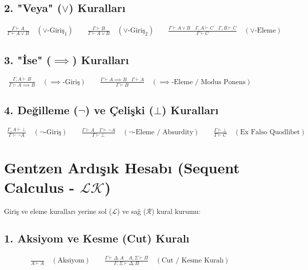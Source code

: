 \documentclass[11pt, a4paper]{article}
\begin{document}
\subsection{2. "Veya" ($\lor$) Kuralları}
\begin{align}
\frac{\Gamma \vdash A}{\Gamma \vdash A \lor B} \quad (\lor\text{-Giriş}_1) \qquad
\frac{\Gamma \vdash B}{\Gamma \vdash A \lor B} \quad (\lor\text{-Giriş}_2) \qquad
\frac{\Gamma \vdash A \lor B \quad \Gamma, A \vdash C \quad \Gamma, B \vdash C}{\Gamma \vdash C} \quad (\lor\text{-Eleme})
\end{align}

\subsection{3. "İse" ($\implies$) Kuralları}
\begin{align}
\frac{\Gamma, A \vdash B}{\Gamma \vdash A \implies B} \quad (\implies\text{-Giriş}) \qquad
\frac{\Gamma \vdash A \implies B \quad \Gamma \vdash A}{\Gamma \vdash B} \quad (\implies\text{-Eleme / Modus Ponens})
\end{align}

\subsection{4. Değilleme ($\neg$) ve Çelişki ($\bot$) Kuralları}
\begin{align}
\frac{\Gamma, A \vdash \bot}{\Gamma \vdash \neg A} \quad (\neg\text{-Giriş}) \qquad
\frac{\Gamma \vdash A \quad \Gamma \vdash \neg A}{\Gamma \vdash \bot} \quad (\neg\text{-Eleme / Absurdity}) \qquad
\frac{\Gamma \vdash \bot}{\Gamma \vdash C} \quad (\text{Ex Falso Quodlibet})
\end{align}

\section{Gentzen Ardışık Hesabı (Sequent Calculus - $\mathcal{L}\mathcal{K}$)}

Giriş ve eleme kuralları yerine sol ($\mathcal{L}$) ve sağ ($\mathcal{R}$) kural kurumu:

\subsection{1. Aksiyom ve Kesme (Cut) Kuralı}
\begin{align}
\frac{}{A \vdash A} \quad (\text{Aksiyom}) \qquad
\frac{\Gamma \vdash \Delta, A \quad A, \Sigma \vdash \Pi}{\Gamma, \Sigma \vdash \Delta, \Pi} \quad (\text{Cut / Kesme Kuralı})
\end{align}
\end{document}
